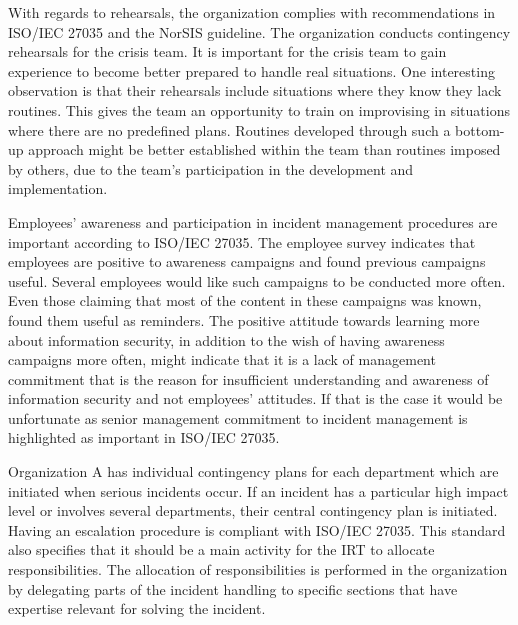 With regards to rehearsals, the organization complies with recommendations in ISO/IEC 27035 and the NorSIS guideline. The organization conducts contingency rehearsals for the crisis team. It is important for the crisis team to gain experience to become better prepared to handle real situations. One interesting observation is that their rehearsals include situations where they know they lack routines. This gives the team an opportunity to train on improvising in situations where there are no predefined plans. Routines developed through such a bottom-up approach might be better established within the team than routines imposed by others, due to the team's participation in the development and implementation.

Employees' awareness and participation in incident management procedures are important according to ISO/IEC 27035. The employee survey indicates that employees are positive to awareness campaigns and found previous campaigns useful. Several employees would like such campaigns to be conducted more often. Even those claiming that most of the content in these campaigns was known, found them useful as reminders. The positive attitude towards learning more about information security, in addition to the wish of having awareness campaigns more often, might indicate that it is a lack of management commitment that is the reason for insufficient understanding and awareness of information security and not employees' attitudes. If that is the case it would be unfortunate as senior management commitment to incident management is highlighted as important in ISO/IEC 27035.

Organization A has individual contingency plans for each department which are initiated when serious incidents occur. If an incident has a particular high impact level or involves several departments, their central contingency plan is initiated. Having an escalation procedure is compliant with ISO/IEC 27035. This standard also specifies that it should be a main activity for the \ac{IRT} to allocate responsibilities. The allocation of responsibilities is performed in the organization by delegating parts of the incident handling to specific sections that have expertise relevant for solving the incident.

